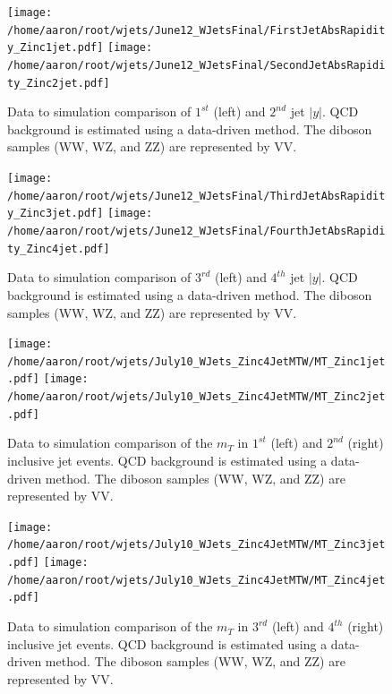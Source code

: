 \documentclass[oneside, letterpaper, oldfontcommands]{memoir}
\begin{document}
\begin{figure}[!Hhtbp]
\begin{center}
\texttt{[image: /home/aaron/root/wjets/June12\_WJetsFinal/FirstJetAbsRapidity\_Zinc1jet.pdf]}
\texttt{[image: /home/aaron/root/wjets/June12\_WJetsFinal/SecondJetAbsRapidity\_Zinc2jet.pdf]}
\end{center}
\caption{Data to simulation comparison of $1^{st}$ (left) and $2^{nd}$ jet $|y|$. QCD background is estimated using a data-driven method. The diboson samples (WW, WZ, and ZZ) are represented by VV.}
\label{eta12}
\end{figure}

\begin{figure}[!Hhtbp]
\begin{center}
\texttt{[image: /home/aaron/root/wjets/June12\_WJetsFinal/ThirdJetAbsRapidity\_Zinc3jet.pdf]}
\texttt{[image: /home/aaron/root/wjets/June12\_WJetsFinal/FourthJetAbsRapidity\_Zinc4jet.pdf]}
\end{center}
\caption{Data to simulation comparison of $3^{rd}$ (left) and $4^{th}$ jet $|y|$. QCD background is estimated using a data-driven method. The diboson samples (WW, WZ, and ZZ) are represented by VV.}
\label{eta34}
\end{figure}

\begin{figure}[!Hhtbp]
\begin{center}
\texttt{[image: /home/aaron/root/wjets/July10\_WJets\_Zinc4JetMTW/MT\_Zinc1jet.pdf]}
\texttt{[image: /home/aaron/root/wjets/July10\_WJets\_Zinc4JetMTW/MT\_Zinc2jet.pdf]}
\end{center}
\caption{Data to simulation comparison of the $m_{T}$ in $1^{st}$ (left) and $2^{nd}$ (right) inclusive jet events. QCD background is estimated using a data-driven method. The diboson samples (WW, WZ, and ZZ) are represented by VV.}
\label{eta12}
\end{figure}

\begin{figure}[!Hhtbp]
\begin{center}
\texttt{[image: /home/aaron/root/wjets/July10\_WJets\_Zinc4JetMTW/MT\_Zinc3jet.pdf]}
\texttt{[image: /home/aaron/root/wjets/July10\_WJets\_Zinc4JetMTW/MT\_Zinc4jet.pdf]}
\end{center}
\caption{Data to simulation comparison of the $m_{T}$ in  $3^{rd}$ (left) and $4^{th}$ (right) inclusive jet events. QCD background is estimated using a data-driven method. The diboson samples (WW, WZ, and ZZ) are represented by VV.}
\label{eta34}
\end{figure}
\end{document}
